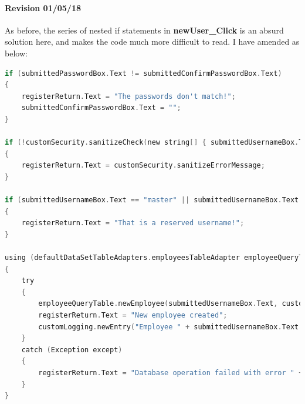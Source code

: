 ﻿\documentclass{article}
\begin{document}
    \paragraph{Revision 01/05/18}
    As before, the series of nested if statements in \textbf{newUser\_Click} is an absurd solution here, and makes the code much more difficult to read.
    I have amended as below:
    \begin{lstlisting}[language=C]
if (submittedPasswordBox.Text != submittedConfirmPasswordBox.Text)
{
    registerReturn.Text = "The passwords don't match!";
    submittedConfirmPasswordBox.Text = "";
}

if (!customSecurity.sanitizeCheck(new string[] { submittedUsernameBox.Text, submittedPasswordBox.Text, forenameBox.Text, surnameBox.Text }))
{
    registerReturn.Text = customSecurity.sanitizeErrorMessage;
}

if (submittedUsernameBox.Text == "master" || submittedUsernameBox.Text == "Market")
{
    registerReturn.Text = "That is a reserved username!";
}

using (defaultDataSetTableAdapters.employeesTableAdapter employeeQueryTable = new defaultDataSetTableAdapters.employeesTableAdapter())
{
    try
    {
        employeeQueryTable.newEmployee(submittedUsernameBox.Text, customSecurity.generateMD5(submittedPasswordBox.Text), adminCheckBox.Checked, forenameBox.Text, surnameBox.Text);
        registerReturn.Text = "New employee created";
        customLogging.newEntry("Employee " + submittedUsernameBox.Text + " was created");
    }
    catch (Exception except)
    {
        registerReturn.Text = "Database operation failed with error " + except.Message;
    }
}
    \end{lstlisting}
    \newpage
\end{document}

